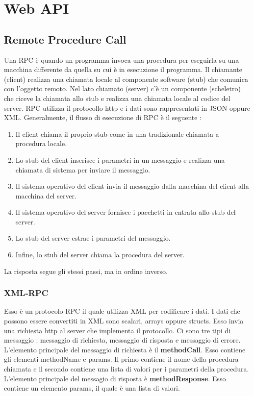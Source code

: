 \documentclass[12pt]{report}
\begin{document}
\chapter{Web API}
\section{Remote Procedure Call}
Una RPC è quando un programma invoca una procedura per eseguirla su una macchina differente da quella su cui è in esecuzione il programma. Il chiamante (client) realizza una chiamata locale al componente software (stub) che comunica con l'oggetto remoto. Nel lato chiamato (server) c'è un componente (scheletro) che riceve la chiamata allo stub e realizza una chiamata locale al codice del server. RPC utilizza il protocollo http e i dati sono rappresentati in JSON oppure XML. Generalmente, il flusso di esecuzione di RPC è il seguente :
\begin{enumerate}
\item Il client chiama il proprio stub come in una tradizionale chiamata a procedura locale.
\item Lo stub del client inserisce i parametri in un messaggio e realizza una chiamata di sistema per inviare il messaggio.
\item Il sistema operativo del client invia il messaggio dalla macchina del client alla macchina del server.
\item Il sistema operativo del server fornisce i pacchetti in entrata allo stub del server.
\item Lo stub del server estrae i parametri del messaggio.
\item Infine, lo stub del server chiama la procedura del server.
\end{enumerate}
La risposta segue gli stessi passi, ma in ordine inverso.
\subsection{XML-RPC}
Esso è un protocolo RPC il quale utilizza XML per codificare i dati. I dati che possono essere convertiti in XML sono scalari, arrays oppure structs. Esso invia una richiesta http al server che implementa il protocollo. Ci sono tre tipi di messaggio : messaggio di richiesta, messaggio di risposta e messaggio di errore. L'elemento principale del messaggio di richiesta è il \textbf{methodCall}. Esso contiene gli elementi methodName e params. Il primo contiene il nome della procedura chiamata e il secondo contiene una lista di valori per i parametri della procedura. L'elemento principale del messagio di risposta è \textbf{methodResponse}. Esso contiene un elemento params, il quale è una lista di valori.
\end{document}

